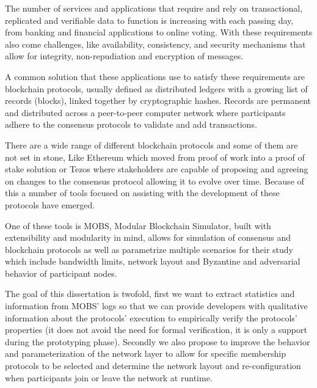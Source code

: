 
%

The number of services and applications that require and rely on transactional, replicated and verifiable data to 
function is increasing with each passing day, from banking and financial applications to online voting. With these
requirements also come challenges, like availability, consistency, and security mechanisms that allow for integrity, non-repudiation and
encryption of messages.

A common solution that these applications use to satisfy these requirements are blockchain protocols, usually defined as
distributed ledgers with a growing list of records (blocks), linked together by cryptographic hashes. Records are permanent and
distributed across a peer-to-peer computer network where participants adhere to the consensus protocols to validate and add
transactions.

There are a wide range of different blockchain protocols and some of them are not set in stone, Like Ethereum which moved from proof of work
into a proof of stake solution or Tezos where stakeholders are capable of proposing and agreeing on changes to the consensus protocol allowing
it to evolve over time. Because of this a number of tools focused on assisting with the development of these protocols have emerged.

One of these tools is MOBS, Modular Blockchain Simulator, built with extensibility and
modularity in mind, allows for simulation of consensus and blockchain protocols as well as parametrize multiple scenarios for their study which
include bandwidth limits, network layout and Byzantine and adversarial behavior of participant nodes.

The goal of this dissertation is twofold, first we want to extract statistics and information from MOBS' logs so that we can provide
developers with qualitative information about the protocols' execution to empirically verify the protocols' properties
(it does not avoid the need for formal verification, it is only a support during the prototyping phase). 
Secondly we also propose to improve the
behavior and parameterization of the network layer to allow for specific membership protocols to be selected and determine
the network layout and re-configuration when participants join or leave the network at runtime.

